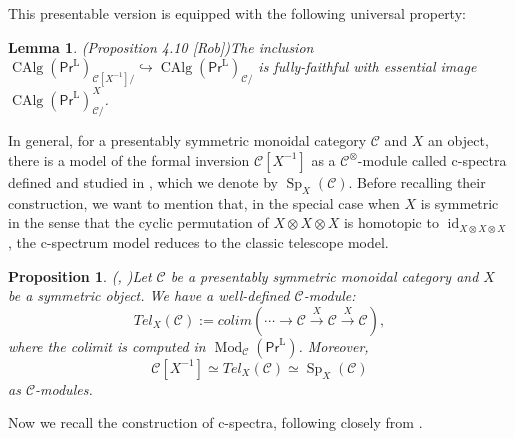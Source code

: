 \documentclass{article}
\newtheorem{lm}[thm]{Lemma}
\newtheorem{prop}[thm]{Proposition}
\theoremstyle{definition}
\newcommand{\on}{\operatorname}
\newcommand{\PrL}{\mathsf{Pr}^\mathrm{L} }
\begin{document}
This presentable version is equipped with the following universal property:
\begin{lm}(Proposition 4.10 [Rob])\label{lm.universal.property.formal.inversion}
The inclusion $\on{CAlg}(\PrL)_{\mathcal{C}[X^{-1}]/} \hookrightarrow \on{CAlg}(\PrL)_{\mathcal{C}/}$ is fully-faithful with essential image $\on{CAlg}(\PrL)^X_{\mathcal{C}/}$.
\end{lm}
In general, for a presentably symmetric monoidal category $\mathcal{C}$ and $X$ an object, there is a model of the formal inversion $\mathcal{C}[X^{-1}]$ as a $\mathcal{C}^\otimes$-module called c-spectra defined and studied in \cite{AI} , which we denote by $\on{Sp}_X(\mathcal{C})$. Before recalling their construction, we want to mention that, in the special case when $X$ is symmetric in the sense that the cyclic permutation of $X\otimes X\otimes X$ is homotopic to $\on{id}_{X\otimes X\otimes X}$, the c-spectrum model reduces to  the classic telescope model.
\begin{prop}(\cite[Proposition 4.21]{Rob}, \cite[Proposition 1.6.3]{AI})\label{tel}
Let $\mathcal{C}$ be a presentably symmetric monoidal category and $X$ be a symmetric object. We have a well-defined $\mathcal{C}$-module:\[
Tel_X(\mathcal{C}):=colim(\cdots\rightarrow\mathcal{C}\xrightarrow{X}\mathcal{C}\xrightarrow{X}\mathcal{C}),\]
where the colimit is computed in $\on{Mod}_\mathcal{C}(\PrL)$. Moreover,\[
\mathcal{C}[X^{-1}]\simeq Tel_X(\mathcal{C})\simeq\on{Sp}_X(\mathcal{C})\]
as $\mathcal{C}$-modules.
\end{prop}
Now we recall the construction of c-spectra, following closely from \cite[Section 1.3]{AI}.
\end{document}
